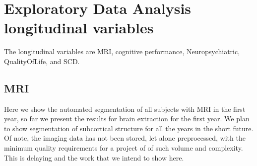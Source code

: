 \documentclass[11pt]{article}
\theoremstyle{definition}
\theoremstyle{remark}
\begin{document}
\section{Exploratory Data Analysis longitudinal variables}
\label{se:eda_long}
The longitudinal variables are MRI, cognitive performance, Neuropsychiatric, QualityOfLife, and SCD.

\subsection{MRI}
\label{sse:mri}
Here we show the automated segmentation of all subjects with MRI in the first year, so far we present the results for brain extraction for the first year. We plan to show segmentation of subcortical structure for all the years in the short future. Of note, the imaging data has not been stored, let alone preprocessed, with the minimum quality requirements for a project of of such volume and complexity. This is delaying and the work that we intend to show here.
\end{document}
